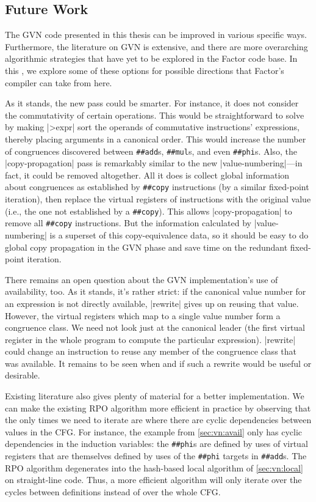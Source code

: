 \subsection{Future Work}\label{sec:vn:future}

The \gls{GVN} code presented in this thesis can be improved in various specific
ways.  Furthermore, the literature on \gls{GVN} is extensive, and there are
more overarching algorithmic strategies that have yet to be explored in the
Factor code base.  In this , we explore some of these
options for possible directions that Factor's compiler can take from here.

As it stands, the new pass could be smarter.  For instance, it does not
consider the commutativity of certain operations.  This would be
straightforward to solve by making \factor|>expr| sort the operands of
commutative instructions' expressions, thereby placing arguments in a canonical
order.  This would increase the number of congruences discovered between
\Verb|##add|s, \Verb|##mul|s, and even \Verb|##phi|s.  Also, the
\factor|copy-propagation| pass is remarkably similar to the new
\factor|value-numbering|---in fact, it could be removed altogether.  All it
does is collect global information about congruences as established by
\Verb|##copy| instructions (by a similar fixed-point iteration), then replace
the virtual registers of instructions with the original value (i.e., the one
not established by a \Verb|##copy|).  This allows \factor|copy-propagation| to
remove all \Verb|##copy| instructions.  But the information calculated by
\factor|value-numbering| is a superset of this copy-equivalence data, so it
should be easy to do global copy propagation in the \gls{GVN} phase and save
time on the redundant fixed-point iteration.

There remains an open question about the \gls{GVN} implementation's use of
availability, too.  As it stands, it's rather strict: if the canonical value
number for an expression is not directly available, \factor|rewrite| gives up
on reusing that value.  However, the virtual registers which map to a single
value number form a congruence class.  We need not look just at the canonical
leader (the first virtual register in the whole program to compute the
particular expression).  \factor|rewrite| could change an instruction to reuse
any member of the congruence class that was available.  It remains to be seen
when and if such a rewrite would be useful or desirable.

Existing literature also gives plenty of material for a better implementation.
We can make the existing \gls{RPO} algorithm more efficient in practice by
observing that the only times we need to iterate are where there are cyclic
dependencies between values in the \gls{CFG}.  For instance, the example from
\cref{sec:vn:avail} only has cyclic dependencies in the induction variables:
the \Verb|##phi|s are defined by uses of virtual registers that are themselves
defined by uses of the \Verb|##phi| targets in \Verb|##add|s.  The \gls{RPO}
algorithm degenerates into the hash-based local algorithm of
\cref{sec:vn:local} on straight-line code.  Thus, a more efficient algorithm
will only iterate over the cycles between definitions instead of over the whole
\gls{CFG}.  

